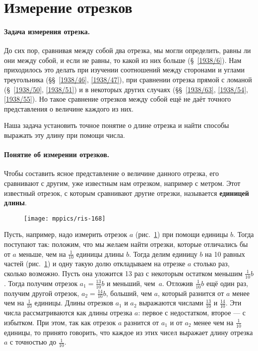 \section{Измерение отрезков}

\paragraph{Задача измерения отрезка.}\label{1938/144}
До сих пор, сравнивая между собой два отрезка, мы могли определить, равны ли они между собой, и если не равны, то какой из них больше (§~\ref{1938/6}).
Нам приходилось это делать при изучении соотношений между сторонами и углами треугольника (§§~\ref{1938/46}, \ref{1938/47}), при сравнении отрезка прямой с ломаной (§~\ref{1938/50}, \ref{1938/51}) и в некоторых других случаях (§§~\ref{1938/63}, \ref{1938/54}, \ref{1938/55}).
Но такое сравнение отрезков между собой ещё не даёт точного представления о величине каждого из них.

Наша задача установить точное понятие о длине отрезка и найти способы выражать эту длину при помощи числа.

\paragraph{Понятие об измерении отрезков.}\label{1938/150} 
Чтобы составить ясное представление о величине данного отрезка, его сравнивают с другим, уже известным нам отрезком, например с метром.
Этот известный отрезок, с которым сравнивают другие отрезки, называется \textbf{единицей длины}.

\begin{figure}[h!]
\centering
\texttt{[image: mppics/ris-168]}
\caption{}\label{1938/ris-168}
\end{figure}

Пусть, например, надо измерить отрезок $a$ (рис.~\ref{1938/ris-168}) при помощи единицы $b$.
Тогда поступают так:
положим, что мы желаем найти отрезки, которые отличались бы от $a$ меньше, чем на
$\tfrac1{10}$ единицы длины $b$.
Тогда делим единицу $b$ на 10 равных частей (рис.~\ref{1938/ris-168}) и одну такую долю откладываем на отрезке $a$ столько раз, сколько возможно.
Пусть она уложится 13 раз с некоторым остатком меньшим $\tfrac1{10}b$.
Тогда получим отрезок $a_1=\tfrac{13}{10}b$ и меньший, чем~$a$.
Отложив $\tfrac1{10}b$ ещё один раз, получим другой отрезок, $a_2=\tfrac{14}{10}b$,  больший, чем $a$, который разнится от $a$ менее чем на $\tfrac1{10}$ единицы.
Длины отрезков $a_1$ и $a_2$ выражаются числами $\tfrac{13}{10}$ и $\tfrac{14}{10}$.
Эти числа рассматриваются как  длины отрезка $a$:
первое с недостатком, второе — с избытком.
При этом, так как отрезок $a$ разнится от $a_1$ и от $a_2$ менее чем на $\tfrac1{10}$ единицы, то принято говорить, что каждое из этих чисел выражает длину отрезка $a$ с точностью до $\tfrac1{10}$.

